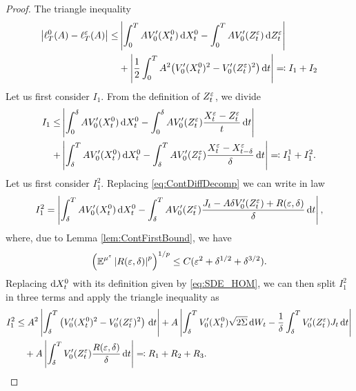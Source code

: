 \documentclass[10pt]{article}
\begin{document}
\begin{proof} The triangle inequality
	\begin{equation}
	\begin{aligned}
		\left\lvert\ell_T^0(A) - \ell_T^\varepsilon(A)\right\rvert \leq &\left\lvert\int_0^T A V_0'(X_t^0) \,\mathrm{d} X_t^0 - \int_0^T A V_0'(Z^\varepsilon_t) \,\mathrm{d} Z^\varepsilon_t\right\rvert \\
		&+ \left\lvert\frac12 \int_0^T A^2 \big(V_0'(X_t^0)^2 - V_0'(Z^\varepsilon_t)^2\big) \,\mathrm{d} t\right\rvert \eqqcolon I_1 + I_2
	\end{aligned}
	\end{equation}
	Let us first consider $I_1$. From the definition of $Z_t^\varepsilon$, we divide
	\begin{equation}
	\begin{aligned}
		 I_1 \leq &\left\lvert\int_0^\delta A V_0'(X_t^0) \,\mathrm{d} X_t^0 - \int_0^\delta A V_0'(Z^\varepsilon_t) \frac{X^\varepsilon_t - Z^\varepsilon_t}{t}\,\mathrm{d} t\right\rvert\\
		 + &\left\lvert\int_\delta^T A V_0'(X_t^0) \,\mathrm{d} X_t^0 - \int_\delta^T A V_0'(Z^\varepsilon_t) \frac{X^\varepsilon_t - X^\varepsilon_{t-\delta}}{\delta}\,\mathrm{d} t\right\rvert \eqqcolon I_1^1 + I_1^2.
	\end{aligned} 
	\end{equation}
	Let us first consider $I_1^2$. Replacing \eqref{eq:ContDiffDecomp} we can write in law
	\begin{equation}
		I_1^2 = \left\lvert\int_\delta^T A V_0'(X_t^0) \,\mathrm{d} X_t^0 - \int_\delta^T A V_0'(Z^\varepsilon_t) \frac{J_t - A\delta V_0'(Z_t^\varepsilon) + R(\varepsilon, \delta)}{\delta}\,\mathrm{d} t\right\rvert,
	\end{equation}
	where, due to Lemma \ref{lem:ContFirstBound}, we have
	\begin{equation}
		\left( \operatorname{\mathbb{E}}^{\mu^\varepsilon} \left\lvert R(\varepsilon, \delta)\right\rvert^p \right)^{1/p} \leq C(\varepsilon^2 + \delta^{1/2} + \delta^{3/2}).
	\end{equation}
	Replacing $\mathrm{d} X^0_t$ with its definition given by \eqref{eq:SDE_HOM}, we can then split $I_1^2$ in three terms and apply the triangle inequality as
	\begin{equation}
	\begin{aligned}
		I_1^2 &\leq A^2 \left\lvert\int_\delta^T  \left(V_0'(X_t^0)^2 - V_0'(Z_t^\varepsilon)^2\right) \,\mathrm{d} t\right\rvert + A \left\lvert\int_\delta^T  V_0'(X^0_t)\sqrt{2\Sigma}\,\mathrm{d} W_t - \frac{1}{\delta} \int_\delta^T V_0'(Z_t^\varepsilon) J_t \,\mathrm{d} t\right\rvert \\
		&\quad+ A \left\lvert\int_\delta^T V_0'(Z_t^\varepsilon) \frac{R(\varepsilon, \delta)}{\delta}\,\mathrm{d} t\right\rvert \eqqcolon R_1 + R_2 + R_3.
	\end{aligned}
	\end{equation}	
\end{proof}
\end{document}

